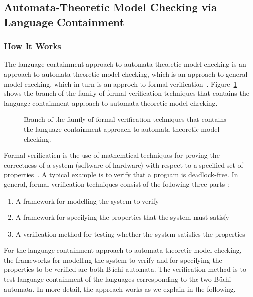 

\subsection{Automata-Theoretic Model Checking via Language Containment}

\subsubsection{How It Works}
The language containment approach to automata-theoretic model checking is an approach to automata-theoretic model checking, which is an approach to general model checking, which in turn is an approch to formal verification~\cite{2007_vardi_model_checking}. Figure~\ref{model_checking} shows the branch of the family of formal verification techniques that contains the language containment approach to automata-theoretic model checking.

\begin{figure}[htb]
\centering
\ModelChecking
\caption{Branch of the family of formal verification techniques that contains the language containment approach to automata-theoretic model checking.}
\label{model_checking}
\end{figure}

Formal verification is the use of mathemtical techniques for proving the correctness of a system (software of hardware) with respect to a specified set of properties~\cite{2007_vardi_model_checking}. A typical example is to verify that a program is deadlock-free. In general, formal verification techniques consist of the following three parts~\cite{huth2004logic}:

\begin{enumerate}
\item A framework for modelling the system to verify
\item A framework for specifying the properties that the system must satisfy
\item A verification method for testing whether the system satisfies the properties
\end{enumerate}

For the language containment approach to automata-theoretic model checking, the frameworks for modelling the system to verify and for specifying the properties to be verified are both Büchi automata. The verification method is to test language containment of the languages corresponding to the two Büchi automata. In more detail, the approach works as we explain in the following.

